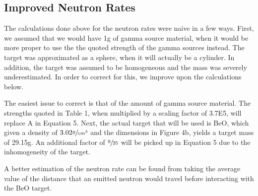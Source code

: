 \documentclass[%
12pt,
twoside,
reprint,
amsmath,amssymb,
aps,
]{article}
\begin{document}
	\subsection{Improved Neutron Rates}
	\par The calculations done above for the neutron rates were naive in a few ways. First, we assumed that we would have 1g of gamma source material, when it would be more proper to use the the quoted strength of the gamma sources instead. The target was approximated as a sphere, when it will actually be a cylinder. In addition, the target was assumed to be homogeneous and the mass was severely underestimated. In order to correct for this, we improve upon the calculations below.
	\par The easiest issue to correct is that of the amount of gamma source material. The strengths quoted in Table 1, when multiplied by a scaling factor of 3.7E5, will replace A in Equation 5. Next, the actual target that will be used is BeO, which given a density of $3.02 \sfrac{g}{cm^{3}}$ and the dimensions in Figure 4b, yields a target mass of 29.15g. An additional factor of $\sfrac{9}{25}$ will be picked up in Equation 5 due to the inhomogeneity of the target.
	\par A better estimation of the neutron rate can be found from taking the average value of the distance that an emitted neutron would travel before interacting with the BeO target.
	
\end{document}
